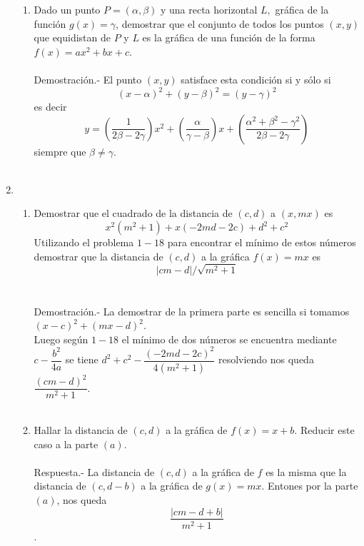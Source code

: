 \begin{enumerate}
\begin{enumerate}[\bfseries (a)]
	\item Dado un punto $P=(\alpha,\beta)$ y una recta horizontal $L,$ gráfica de la función $g(x)=\gamma$, demostrar que el conjunto de todos los puntos $(x,y)$ que equidistan de $P$ y $L$ es la gráfica de una función de la forma $f(x)=ax^2 + bx + c$.\\\\
	Demostración.-\; El punto $(x,y)$ satisface esta condición si y sólo si $$(x-\alpha)^2 + (y-\beta)^2 = (y-\gamma)^2$$ es decir $$y=\left(\dfrac{1}{2\beta - 2 \gamma}\right)x^2 + \left(\dfrac{\alpha}{\gamma - \beta}\right) x + \left(\dfrac{\alpha^2 + \beta^2 - \gamma^2}{2\beta - 2\gamma}\right)$$ siempre que $\beta \neq \gamma$.\\\\

    \end{enumerate}

    \item 
    \begin{enumerate}[\bfseries (a)]
	
	\item Demostrar que el cuadrado de la distancia de $(c,d)$ a $(x,mx)$ es $$x^2(m^2+1)+x(-2md-2c)+d^2+c^2$$ Utilizando el problema $1-18$ para encontrar el mínimo de estos números demostrar que la distancia de $(c,d)$ a la gráfica $f(x)=mx$ es $$|cm-d|/\sqrt{m^2+1}$$\\\\
	    Demostración.-\; La demostrar de la primera parte es sencilla si tomamos $(x-c)^2+(mx-d)^2$.\\
	    Luego según $1-18$ el mínimo de dos números se encuentra mediante $c-\dfrac{b^2}{4a}$ se tiene $d^2 + c^2 - \dfrac{(-2md-2c)^2}{4(m^2+1)}$ resolviendo nos queda $\dfrac{(cm-d)^2}{m^2+1}$.\\\\

	\item Hallar la distancia de $(c,d)$ a la gráfica de $f(x)=x+b$. Reducir este caso a la parte $(a)$.\\\\
	    Respuesta.-\; La distancia de $(c,d)$ a la gráfica de $f$ es la misma que la distancia de $(c,d-b)$ a la gráfica de $g(x)=mx$. Entones por la parte $(a)$, nos queda $$\dfrac{|cm-d+b|}{m^2+1}$$.\\\\
    \end{enumerate}


\end{enumerate}
